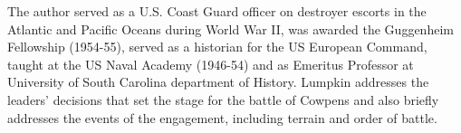 The author served as a U.S. Coast Guard officer on destroyer escorts in the
Atlantic and Pacific Oceans during World War II, was awarded the Guggenheim
Fellowship (1954-55), served as a historian for the US European Command, taught
at the US Naval Academy (1946-54) and as Emeritus Professor at University of
South Carolina department of History.  Lumpkin addresses the leaders' decisions
that set the stage for the battle of Cowpens and also briefly addresses the
events of the engagement, including terrain and order of battle. 
%
